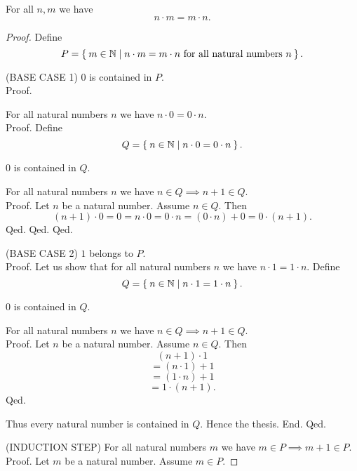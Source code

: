 \documentclass[../../arithmetic.tex]{subfiles}
\begin{document}
  \begin{forthel}
    \begin{proposition}\label{Arithmetic_01_03_850937}
      For all $n,m$ we have \[ n \cdot m = m \cdot n. \]
    \end{proposition}
    \begin{proof}
      Define \[ P = \Set{m \in \mathbb{N} | \text{$n \cdot m = m \cdot n$ for all natural numbers $n$}}. \]

      (BASE CASE 1) $0$ is contained in $P$. \\
      Proof.

        For all natural numbers $n$ we have $n \cdot 0 = 0 \cdot n$. \\
        Proof.
          Define \[ Q = \Set{n \in \mathbb{N} | n \cdot 0 = 0 \cdot n}. \]

          $0$ is contained in $Q$.

          For all natural numbers $n$ we have $n \in Q \implies n + 1 \in Q$. \\
          Proof.
            Let $n$ be a natural number.
            Assume $n \in Q$.
            Then
            \[
              (n + 1) \cdot 0
            = 0                 %
            = n \cdot 0         %
            = 0 \cdot n         %
            = (0 \cdot n) + 0   %
            = 0 \cdot (n + 1).  %
            \]
          Qed.
        Qed.
      Qed.

      (BASE CASE 2) $1$ belongs to $P$. \\
      Proof.
        Let us show that for all natural numbers $n$ we have $n \cdot 1 = 1 \cdot n$.
          Define \[ Q = \Set{n \in \mathbb{N} | n \cdot 1 = 1 \cdot n}. \]

          $0$ is contained in $Q$.

          For all natural numbers $n$ we have $n \in Q \implies n + 1 \in Q$. \\
          Proof.
            Let $n$ be a natural number.
            Assume $n \in Q$.
            Then
            \[   (n + 1) \cdot 1 \]
            \[ = (n \cdot 1) + 1 \]   %
            \[ = (1 \cdot n) + 1 \]   %
            \[ = 1 \cdot (n + 1). \]  %
          Qed.

          Thus every natural number is contained in $Q$.
          Hence the thesis.
        End.
      Qed.

      (INDUCTION STEP) For all natural numbers $m$ we have $m \in P \implies m + 1 \in P$. \\
      Proof.
        Let $m$ be a natural number.
        Assume $m \in P$.


\end{proof}
\end{forthel}
\end{document}
